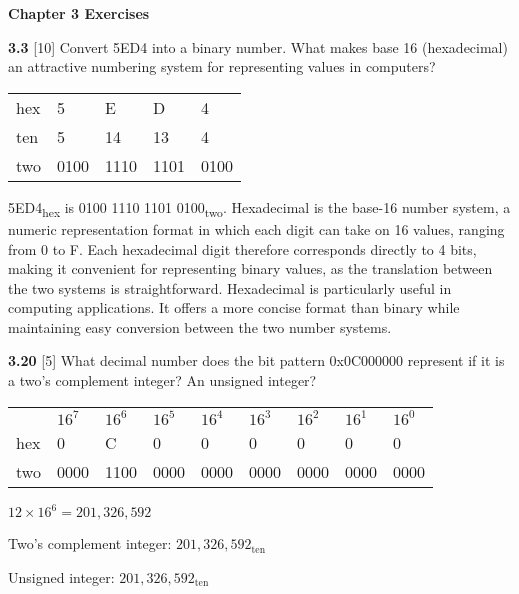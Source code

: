 \documentclass[fleqn]{article}
\begin{document}
\pagestyle{fancy}
\fancyhead{}
\fancyhead[R]{\thepage}
\fancyfoot{}

\begin{center}
    \Large{\textbf{Chapter 3 Exercises}}\\
\end{center}
\vspace{0.25in}

\textbf{3.3} [10] \textrangle \; Convert 5ED4 into a binary number. What makes base 16 (hexadecimal) an attractive numbering system for representing values in computers?
\vspace{0.125in}

\begin{addmargin}[0.15cm]{0cm}
\begin{table}[H]
    \begin{tabular}{l|llll}
        hex & 5 & E & D & 4 \\
        ten & 5 & 14 & 13 & 4 \\
        two & 0100 & 1110 & 1101 & 0100
    \end{tabular}
\end{table}

5ED4\textsubscript{hex} is 0100 1110 1101 0100\textsubscript{two}. 
Hexadecimal is the base-16 number system, a numeric representation format in which each digit can take on 16 values, ranging from 0 to F. Each hexadecimal digit therefore corresponds directly to 4 bits, making it convenient for representing binary values, as the translation between the two systems is straightforward. Hexadecimal is particularly useful in computing applications. It offers a more concise format than binary while maintaining easy conversion between the two number systems.
\end{addmargin}

\vspace{0.5in}
\textbf{3.20} [5] \textrangle \; What decimal number does the bit pattern 0x0C000000 represent if it is a two's complement integer? An unsigned integer?
\vspace{0.125in}

\begin{addmargin}[0.15cm]{0cm}
\begin{table}[H]
    \begin{tabular}{l|llllllll}
        & $16^7$ & $16^6$ & $16^5$ & $16^4$ & $16^3$ & $16^2$ & $16^1$ & $16^0$ \\ 
        hex & 0 & C & 0 & 0 & 0 & 0 & 0 & 0 \\
        two & 0000 & 1100 & 0000 & 0000 & 0000 & 0000 & 0000 & 0000
    \end{tabular}
\end{table}
$12 \times 16^6 = 201,326,592$

\vspace{0.125in}
Two's complement integer: $201,326,592_{\text{ten}}$

Unsigned integer: $201,326,592_{\text{ten}}$

\end{addmargin}
\end{document}
